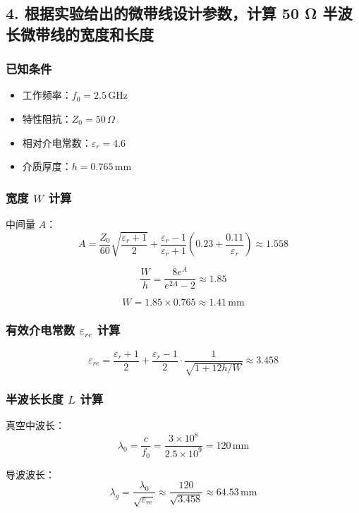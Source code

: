 \documentclass[12pt,a4paper]{article}
\begin{document}
\subsection*{4. 根据实验给出的微带线设计参数，计算 50 Ω 半波长微带线的宽度和长度}

\subsubsection*{已知条件}
\begin{itemize}
    \item 工作频率：\( f_0 = 2.5 \, \text{GHz} \)
    \item 特性阻抗：\( Z_0 = 50 \, \Omega \)
    \item 相对介电常数：\( \varepsilon_r = 4.6 \)
    \item 介质厚度：\( h = 0.765 \, \text{mm} \)
\end{itemize}

\subsubsection*{宽度 \( W \) 计算}

中间量 \( A \)：
\[
A = \frac{Z_0}{60}\sqrt{\frac{\varepsilon_r+1}{2}} + \frac{\varepsilon_r-1}{\varepsilon_r+1}\left(0.23+\frac{0.11}{\varepsilon_r}\right) \approx 1.558
\]

\[
\frac{W}{h} = \frac{8e^A}{e^{2A}-2} \approx 1.85
\]

\[
W = 1.85 \times 0.765 \approx \boxed{1.41 \, \text{mm}}
\]

\subsubsection*{有效介电常数 \( \varepsilon_{re} \) 计算}

\[
\varepsilon_{re} = \frac{\varepsilon_r+1}{2} + \frac{\varepsilon_r-1}{2} \cdot \frac{1}{\sqrt{1+12h/W}} \approx \boxed{3.458}
\]

\subsubsection*{半波长长度 \( L \) 计算}

真空中波长：
\[
\lambda_0 = \frac{c}{f_0} = \frac{3\times10^8}{2.5\times10^9} = 120 \, \text{mm}
\]

导波波长：
\[
\lambda_g = \frac{\lambda_0}{\sqrt{\varepsilon_{re}}} \approx \frac{120}{\sqrt{3.458}} \approx 64.53 \, \text{mm}
\]
\end{document}
